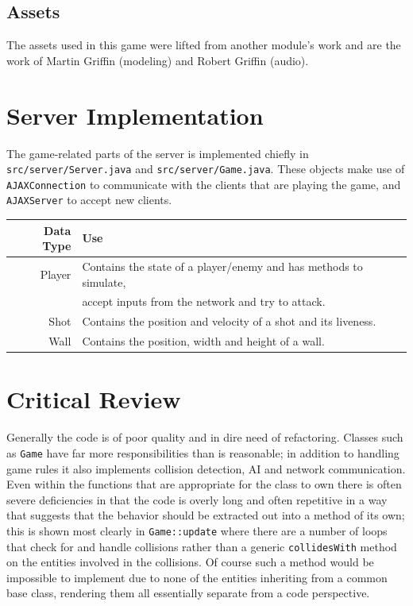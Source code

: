 \documentclass{article}
\begin{document}

\subsection{Assets}
The assets used in this game were lifted from another module's work and are the
work of Martin Griffin (modeling) and Robert Griffin (audio).

\section{Server Implementation}
The game-related parts of the server is implemented chiefly in \texttt{src/server/Server.java}
and \texttt{src/server/Game.java}.  These objects make use of \texttt{AJAXConnection}
to communicate with the clients that are playing the game, and \texttt{AJAXServer}
to accept new clients.

\begin{tabular}{r|l}
\textbf{Data Type} & \textbf{Use} \\
\hline
Player & Contains the state of a player/enemy and has methods to simulate, \\
& accept inputs from the network and try to attack. \\
Shot & Contains the position and velocity of a shot and its liveness. \\
Wall & Contains the position, width and height of a wall. \\
\end{tabular}

\section{Critical Review}
Generally the code is of poor quality and in dire need of refactoring.  Classes
such as \texttt{Game} have far more responsibilities than is reasonable; in
addition to handling game rules it also implements collision detection, AI and
network communication.  Even within the functions that are appropriate for the
class to own there is often severe deficiencies in that the code is overly long
and often repetitive in a way that suggests that the behavior should be extracted
out into a method of its own; this is shown most clearly in \texttt{Game::update}
where there are a number of loops that check for and handle collisions rather than
a generic \texttt{collidesWith} method on the entities involved in the collisions.  Of course
such a method would be impossible to implement due to none of the entities inheriting
from a common base class, rendering them all essentially separate from a code
perspective.
\end{document}
